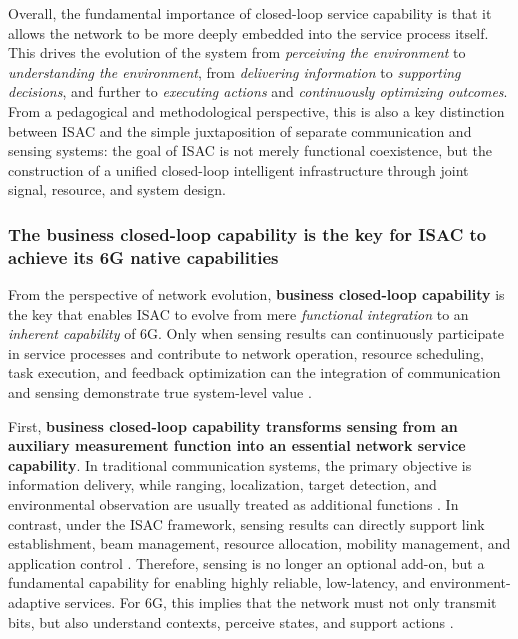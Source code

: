 Overall, the fundamental importance of closed-loop service capability is that it allows the network to be more deeply embedded into the service process itself. This drives the evolution of the system from \emph{perceiving the environment} to \emph{understanding the environment}, from \emph{delivering information} to \emph{supporting decisions}, and further to \emph{executing actions} and \emph{continuously optimizing outcomes}. From a pedagogical and methodological perspective, this is also a key distinction between ISAC and the simple juxtaposition of separate communication and sensing systems: the goal of ISAC is not merely functional coexistence, but the construction of a unified closed-loop intelligent infrastructure through joint signal, resource, and system design.

\subsubsection{The business closed-loop capability is the key for ISAC to achieve its 6G native capabilities}
\label{subsubsec:ch1-isac-core value-closed loop-6g}

From the perspective of network evolution, \textbf{business closed-loop capability} is the key that enables ISAC to evolve from mere \emph{functional integration} to an \emph{inherent capability} of 6G. Only when sensing results can continuously participate in service processes and contribute to network operation, resource scheduling, task execution, and feedback optimization can the integration of communication and sensing demonstrate true system-level value \cite{Liu2022ISAC,Zhang2021ISAC6G,Saad2020Vision6G}.

First, \textbf{business closed-loop capability transforms sensing from an auxiliary measurement function into an essential network service capability}. In traditional communication systems, the primary objective is information delivery, while ranging, localization, target detection, and environmental observation are usually treated as additional functions \cite{Sturm2011WaveformDesign}. In contrast, under the ISAC framework, sensing results can directly support link establishment, beam management, resource allocation, mobility management, and application control \cite{Kaushik2024toward}. Therefore, sensing is no longer an optional add-on, but a fundamental capability for enabling highly reliable, low-latency, and environment-adaptive services. For 6G, this implies that the network must not only transmit bits, but also understand contexts, perceive states, and support actions \cite{Saad2020Vision6G,Strinati20216G}.

